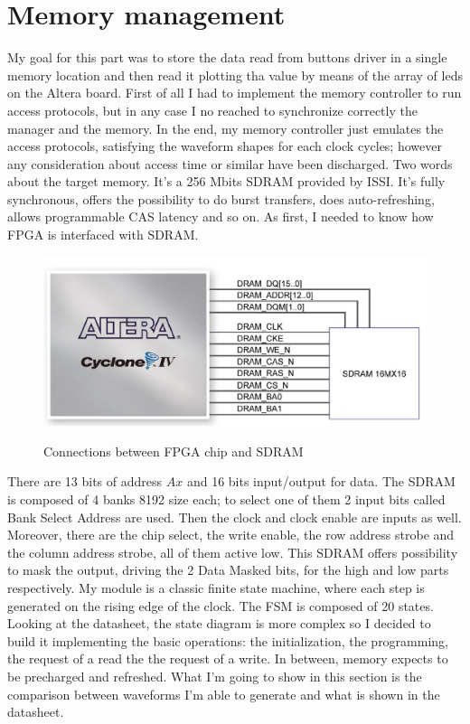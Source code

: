 \section{Memory management}

My goal for this part was to store the data read from buttons driver in a single memory location and then read it plotting tha value by means of the array of leds on the Altera board. First of all I had to implement the memory controller to run access protocols, but in any case I no reached to synchronize correctly the manager and the memory. In the end, my memory controller just emulates the access protocols, satisfying the waveform shapes for each clock cycles; however any consideration about access time or similar have been discharged.
\newline
Two words about the target memory. It's a 256 Mbits SDRAM provided by ISSI. It's fully synchronous, offers the possibility to do burst transfers, does auto-refreshing, allows programmable CAS latency and so on.
\newline
\newline
As first, I needed to know how FPGA is interfaced with SDRAM.
\begin{figure}[H]
\centering
\includegraphics[scale=.7]{Immagini/25}
\label{25}
\caption{Connections between FPGA chip and SDRAM}
\end{figure}

There are 13 bits of address $Ax$ and 16 bits input/output for data. The SDRAM is composed of 4 banks 8192 size each; to select one of them 2 input bits called Bank Select Address are used. Then the clock and clock enable are inputs as well. Moreover, there are the chip select, the write enable, the row address strobe and the column address strobe, all of them active low. This SDRAM offers possibility to mask the output, driving the 2 Data Masked bits, for the high and low parts respectively.
\newline
\newline
My module is a classic finite state machine, where each step is generated on the rising edge of the clock. The FSM is composed of 20 states. Looking at the datasheet, the state diagram is more complex so I decided to build it implementing the basic operations: the initialization, the programming,  the request of a read the the request of a write. In between, memory expects to be precharged and refreshed. What I'm going to show in this section is the comparison between waveforms I'm able to generate and what is shown in the datasheet.
\newpage


